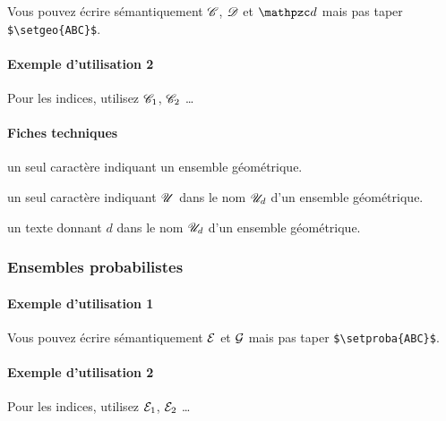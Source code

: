 \documentclass[12pt,a4paper]{article}
\begin{document}
\begin{tcblisting}{}
Vous pouvez écrire sémantiquement $\setgeo{C}$, $\setgeo{D}$ et $\setgeo{d}$ mais pas
taper \verb+$\setgeo{ABC}$+.
\end{tcblisting}


\paragraph{Exemple d'utilisation 2}

\begin{tcblisting}{}
Pour les indices, utilisez $\setgeo*{C}{1}$, $\setgeo*{C}{2}$ \dots
\end{tcblisting}


\paragraph{Fiches techniques}


\IDarg{} un seul caractère \ascii{} indiquant un ensemble géométrique.


\bigskip



 un seul caractère \ascii{} indiquant $\setgeo{U}$ dans le nom $\setgeo*{U}{d}$ d'un ensemble géométrique.

 un texte donnant $d$ dans le nom $\setgeo*{U}{d}$ d'un ensemble géométrique.



\subsubsection{Ensembles probabilistes}

\paragraph{Exemple d'utilisation 1}

\begin{tcblisting}{}
Vous pouvez écrire sémantiquement $\setproba{E}$ et $\setproba{G}$ mais pas taper
\verb+$\setproba{ABC}$+.
\end{tcblisting}


\paragraph{Exemple d'utilisation 2}

\begin{tcblisting}{}
Pour les indices, utilisez $\setproba*{E}{1}$, $\setproba*{E}{2}$ \dots
\end{tcblisting}
\end{document}

